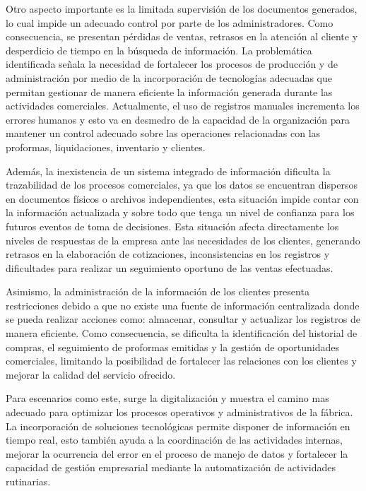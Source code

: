 Otro aspecto importante es la limitada supervisión de los documentos generados, lo cual impide un adecuado control por parte de los administradores. Como consecuencia, se presentan pérdidas de ventas, retrasos en la atención al cliente y desperdicio de tiempo en la búsqueda de información. La problemática identificada señala la necesidad de fortalecer los procesos de producción y de administración por medio de la incorporación de tecnologías adecuadas que permitan gestionar de manera eficiente la información generada durante las actividades comerciales. Actualmente, el uso de registros manuales incrementa los errores humanos y esto va en desmedro de la capacidad de la organización para mantener un control adecuado sobre las operaciones relacionadas con las proformas, liquidaciones, inventario y clientes.

Además, la inexistencia de un sistema integrado de información dificulta la trazabilidad de los procesos comerciales, ya que los datos se encuentran dispersos en documentos físicos o archivos independientes, esta situación impide contar con la información actualizada y sobre todo que tenga un nivel de confianza para los futuros eventos de toma de decisiones. Esta situación afecta directamente los niveles de respuestas de la empresa ante las necesidades de los clientes, generando retrasos en la elaboración de cotizaciones, inconsistencias en los registros y dificultades para realizar un seguimiento oportuno de las ventas efectuadas.

Asimismo, la administración de la información de los clientes presenta restricciones debido a que no existe una fuente de información centralizada donde se pueda realizar acciones como: almacenar, consultar y actualizar los registros de manera eficiente. Como consecuencia, se dificulta la identificación del historial de compras, el seguimiento de proformas emitidas y la gestión de oportunidades comerciales, limitando la posibilidad de fortalecer las relaciones con los clientes y mejorar la calidad del servicio ofrecido.

Para escenarios como este, surge la digitalización y muestra el camino mas adecuado para optimizar los procesos operativos y administrativos de la fábrica. La incorporación de soluciones tecnológicas permite disponer de información en tiempo real, esto también ayuda a la coordinación de las actividades internas, mejorar la ocurrencia del error en el proceso de manejo de datos y fortalecer la capacidad de gestión empresarial mediante la automatización de actividades rutinarias.

